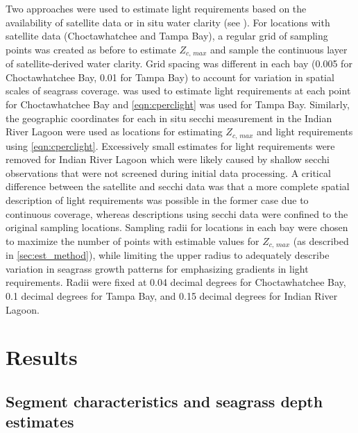 \documentclass[letterpaper,12pt,oneside]{article}\usepackage[]{graphicx}\usepackage[]{color}
\begin{document}
Two approaches were used to estimate light requirements based on the availability of satellite data or in situ water clarity (see \label{sec:clar_est}).  For locations with satellite data (Choctawhatchee and Tampa Bay), a regular grid of sampling points was created as before to estimate $Z_{c,\,max}$ and sample the continuous layer of satellite-derived water clarity.  Grid spacing was different in each bay (0.005 for Choctawhatchee Bay, 0.01 for Tampa Bay) to account for variation in spatial scales of seagrass coverage.   was used to estimate light requirements at each point for Choctawhatchee Bay and \cref{eqn:cperclight} was used for Tampa Bay.  Similarly, the geographic coordinates for each in situ secchi measurement in the Indian River Lagoon were used as locations for estimating $Z_{c,\,max}$ and light requirements using \cref{eqn:cperclight}.  Excessively small estimates for light requirements were removed for Indian River Lagoon which were likely caused by shallow secchi observations that were not screened during initial data processing.  A critical difference between the satellite and secchi data was that a more complete spatial description of light requirements was possible in the former case due to continuous coverage, whereas descriptions using secchi data were confined to the original sampling locations.  Sampling radii for locations in each bay were chosen to maximize the number of points with estimable values for $Z_{c,\,max}$ (as described in \cref{sec:est_method}), while limiting the upper radius to adequately describe variation in seagrass growth patterns for emphasizing gradients in light requirements. Radii were fixed at 0.04 decimal degrees for Choctawhatchee Bay, 0.1 decimal degrees for Tampa Bay, and 0.15 decimal degrees for Indian River Lagoon.

\section{Results}

\subsection{Segment characteristics and seagrass depth estimates}

\end{document}

